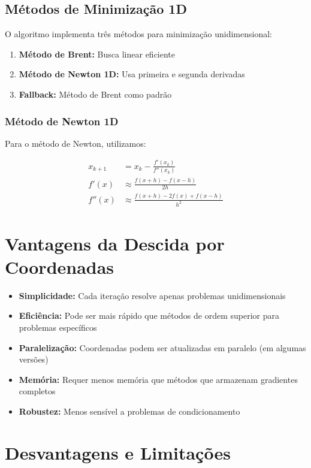 \documentclass[12pt]{article}
\begin{document}
\subsection{Métodos de Minimização 1D}

O algoritmo implementa três métodos para minimização unidimensional:

\begin{enumerate}
    \item \textbf{Método de Brent:} Busca linear eficiente
    \item \textbf{Método de Newton 1D:} Usa primeira e segunda derivadas
    \item \textbf{Fallback:} Método de Brent como padrão
\end{enumerate}

\subsubsection{Método de Newton 1D}

Para o método de Newton, utilizamos:

\begin{align}
x_{k+1} &= x_k - \frac{f'(x_k)}{f''(x_k)} \\
f'(x) &\approx \frac{f(x+h) - f(x-h)}{2h} \\
f''(x) &\approx \frac{f(x+h) - 2f(x) + f(x-h)}{h^2}
\end{align}

\section{Vantagens da Descida por Coordenadas}

\begin{itemize}
    \item \textbf{Simplicidade:} Cada iteração resolve apenas problemas unidimensionais
    \item \textbf{Eficiência:} Pode ser mais rápido que métodos de ordem superior para problemas específicos
    \item \textbf{Paralelização:} Coordenadas podem ser atualizadas em paralelo (em algumas versões)
    \item \textbf{Memória:} Requer menos memória que métodos que armazenam gradientes completos
    \item \textbf{Robustez:} Menos sensível a problemas de condicionamento
\end{itemize}

\section{Desvantagens e Limitações}
\end{document}
